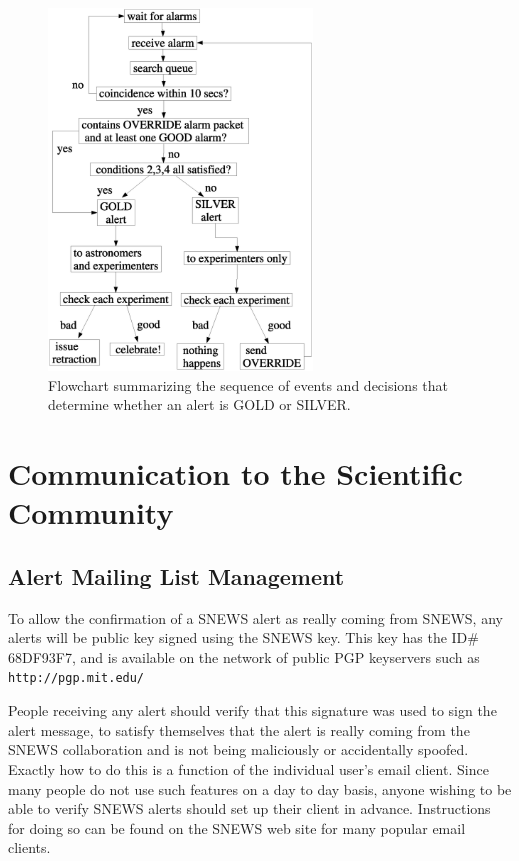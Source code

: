 \documentclass{article}
\begin{document}
\begin{figure}[htbp]
\begin{center}
\includegraphics[width=7cm, bb= 40 120 539 820]{flowchart.eps}
\caption{\label{fig:flowchart} Flowchart summarizing the 
sequence of events and decisions that determine whether an
alert is GOLD or SILVER.}
\end{center}
\end{figure}



\section{Communication to the Scientific Community}

\subsection{Alert Mailing List Management}

To allow the confirmation of a SNEWS alert as really coming from SNEWS,
any alerts will be public key signed using the SNEWS key.  This key has
the ID\# 68DF93F7, and is available on the network of public PGP
keyservers such as \texttt{http://pgp.mit.edu/}

People receiving any alert should verify that this signature was used to
sign the alert message, to satisfy themselves that the alert is really
coming from the SNEWS collaboration and is not being maliciously or
accidentally spoofed.  Exactly how to do this is a function of the
individual user's email client.  Since many people do not use such
features on a day to day basis, anyone wishing to be able to verify
SNEWS alerts should set up their client in advance.  Instructions for
doing so can be found on the SNEWS web site for many popular email
clients.  
\end{document}
